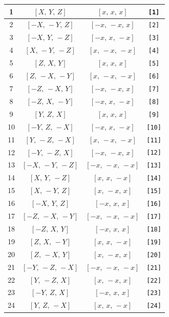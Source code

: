 \documentclass[fleqn,8pt]{jsarticle}
\begin{document}
\begin{longtable}{cccc}
1 & $\left[ X,\, Y,\, Z \right]$ & $\left[ x,\, x,\, x \right]$ & {\tt [1]} \\ \hline
2 & $\left[ - X,\, - Y,\, Z \right]$ & $\left[ - x,\, - x,\, x \right]$ & {\tt [2]} \\ \hline
3 & $\left[ - X,\, Y,\, - Z \right]$ & $\left[ - x,\, x,\, - x \right]$ & {\tt [3]} \\ \hline
4 & $\left[ X,\, - Y,\, - Z \right]$ & $\left[ x,\, - x,\, - x \right]$ & {\tt [4]} \\ \hline
5 & $\left[ Z,\, X,\, Y \right]$ & $\left[ x,\, x,\, x \right]$ & {\tt [5]} \\ \hline
6 & $\left[ Z,\, - X,\, - Y \right]$ & $\left[ x,\, - x,\, - x \right]$ & {\tt [6]} \\ \hline
7 & $\left[ - Z,\, - X,\, Y \right]$ & $\left[ - x,\, - x,\, x \right]$ & {\tt [7]} \\ \hline
8 & $\left[ - Z,\, X,\, - Y \right]$ & $\left[ - x,\, x,\, - x \right]$ & {\tt [8]} \\ \hline
9 & $\left[ Y,\, Z,\, X \right]$ & $\left[ x,\, x,\, x \right]$ & {\tt [9]} \\ \hline
10 & $\left[ - Y,\, Z,\, - X \right]$ & $\left[ - x,\, x,\, - x \right]$ & {\tt [10]} \\ \hline
11 & $\left[ Y,\, - Z,\, - X \right]$ & $\left[ x,\, - x,\, - x \right]$ & {\tt [11]} \\ \hline
12 & $\left[ - Y,\, - Z,\, X \right]$ & $\left[ - x,\, - x,\, x \right]$ & {\tt [12]} \\ \hline
13 & $\left[ - X,\, - Y,\, - Z \right]$ & $\left[ - x,\, - x,\, - x \right]$ & {\tt [13]} \\ \hline
14 & $\left[ X,\, Y,\, - Z \right]$ & $\left[ x,\, x,\, - x \right]$ & {\tt [14]} \\ \hline
15 & $\left[ X,\, - Y,\, Z \right]$ & $\left[ x,\, - x,\, x \right]$ & {\tt [15]} \\ \hline
16 & $\left[ - X,\, Y,\, Z \right]$ & $\left[ - x,\, x,\, x \right]$ & {\tt [16]} \\ \hline
17 & $\left[ - Z,\, - X,\, - Y \right]$ & $\left[ - x,\, - x,\, - x \right]$ & {\tt [17]} \\ \hline
18 & $\left[ - Z,\, X,\, Y \right]$ & $\left[ - x,\, x,\, x \right]$ & {\tt [18]} \\ \hline
19 & $\left[ Z,\, X,\, - Y \right]$ & $\left[ x,\, x,\, - x \right]$ & {\tt [19]} \\ \hline
20 & $\left[ Z,\, - X,\, Y \right]$ & $\left[ x,\, - x,\, x \right]$ & {\tt [20]} \\ \hline
21 & $\left[ - Y,\, - Z,\, - X \right]$ & $\left[ - x,\, - x,\, - x \right]$ & {\tt [21]} \\ \hline
22 & $\left[ Y,\, - Z,\, X \right]$ & $\left[ x,\, - x,\, x \right]$ & {\tt [22]} \\ \hline
23 & $\left[ - Y,\, Z,\, X \right]$ & $\left[ - x,\, x,\, x \right]$ & {\tt [23]} \\ \hline
24 & $\left[ Y,\, Z,\, - X \right]$ & $\left[ x,\, x,\, - x \right]$ & {\tt [24]} \\
\end{longtable}
\end{document}
